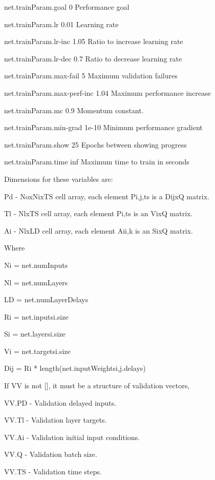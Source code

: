        net.trainParam.goal            0  Performance goal

       net.trainParam.lr           0.01  Learning rate

       net.trainParam.lr-inc       1.05  Ratio to increase learning rate

       net.trainParam.lr-dec        0.7  Ratio to decrease learning rate

       net.trainParam.max-fail        5  Maximum validation failures

       net.trainParam.max-perf-inc 1.04  Maximum performance increase

       net.trainParam.mc            0.9  Momentum constant.

       net.trainParam.min-grad    1e-10  Minimum performance gradient

       net.trainParam.show           25  Epochs between showing progress

       net.trainParam.time          inf  Maximum time to train in seconds

     Dimensions for these variables are:

       Pd - NoxNixTS cell array, each element P{i,j,ts} is a DijxQ matrix.

       Tl - NlxTS cell array, each element P{i,ts} is an VixQ matrix.

       Ai - NlxLD cell array, each element Ai{i,k} is an SixQ matrix.

     Where

       Ni = net.numInputs

       Nl = net.numLayers

       LD = net.numLayerDelays

       Ri = net.inputs{i}.size

       Si = net.layers{i}.size

       Vi = net.targets{i}.size

       Dij = Ri * length(net.inputWeights{i,j}.delays)

     If VV is not [], it must be a structure of validation vectors,

       VV.PD - Validation delayed inputs.

       VV.Tl - Validation layer targets.

       VV.Ai - Validation initial input conditions.

       VV.Q  - Validation batch size.

       VV.TS - Validation time steps.

